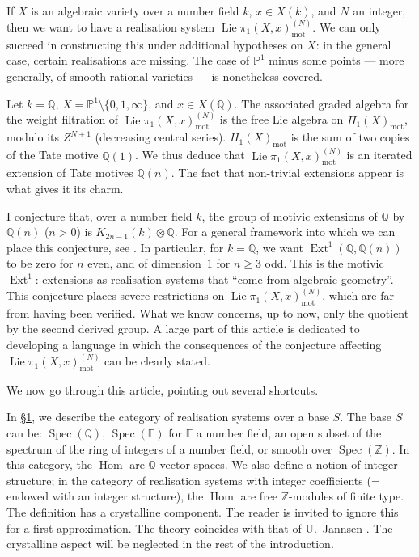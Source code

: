 \documentclass{article}
\theoremstyle{definition}
\newcommand{\mot}{\mathrm{mot}}
\newcommand{\bb}{\mathbb}
\newcommand{\PP}{\bb{P}}
\newcommand{\ZZ}{\bb{Z}}
\newcommand{\FF}{\bb{F}}
\newcommand{\QQ}{\bb{Q}}
\renewcommand{\geq}{\geqslant}
\DeclareMathOperator{\Lie}{Lie}
\DeclareMathOperator{\Ext}{Ext}
\DeclareMathOperator{\Spec}{Spec}
\DeclareMathOperator{\Hom}{Hom}
\newcommand{\oldpage}[1]{\marginpar{\footnotesize$\Big\vert$ \textit{p.~#1}}}
\begin{document}
If $X$ is an algebraic variety over a number field $k$, $x\in X(k)$, and $N$ an integer, then we want to have a realisation system $\Lie\pi_1(X,x)_\mot^{(N)}$.
We can only succeed in constructing this under additional hypotheses on $X$: in the general case, certain realisations are missing.
The case of $\PP^1$ minus some points --- more generally, of smooth rational varieties --- is nonetheless covered.

Let $k=\QQ$, $X=\PP^1\setminus\{0,1,\infty\}$, and $x\in X(\QQ)$.
The associated graded algebra for the weight filtration of $\Lie\pi_1(X,x)_\mot^{(N)}$ is the free Lie algebra on $H_1(X)_\mot$, modulo its $Z^{N+1}$ (decreasing central series).
$H_1(X)_\mot$ is the sum of two copies of the Tate motive $\QQ(1)$.
We thus deduce that $\Lie\pi_1(X,x)_\mot^{(N)}$ is an iterated extension of Tate motives $\QQ(n)$.
The fact that non-trivial extensions appear is what gives it its charm.

I conjecture that, over a number field $k$, the group of motivic extensions of $\QQ$ by $\QQ(n)$ ($n>0$) is $K_{2n-1}(k)\otimes\QQ$.
For a general framework into which we can place this conjecture, see \cite[§5]{B}.
In particular, for $k=\QQ$, we want $\Ext^1(\QQ,\QQ(n))$ to be zero for $n$ even, and of dimension~$1$ for $n\geq3$ odd.
This is the motivic $\Ext^1$: extensions as realisation systems that ``come from algebraic geometry''.
This conjecture places severe restrictions on $\Lie\pi_1(X,x)_\mot^{(N)}$, which are far from having been verified.
What we know concerns, up to now, only the quotient by the second derived group.
A large part of this article is dedicated to developing a language in which the consequences of the conjecture affecting $\Lie\pi_1(X,x)_\mot^{(N)}$ can be clearly stated.

We now go through this article, pointing out several shortcuts.

In \hyperref[1]{\S1}, we describe the category of realisation systems over a base $S$.
The base $S$ can be: $\Spec(\QQ)$, $\Spec(\FF)$ for $\FF$ a number field, an open subset of the spectrum of the ring of integers of a number field, or smooth over $\Spec(\ZZ)$.
In this category, the $\Hom$ are $\QQ$-vector spaces.
We also define a notion of integer structure;
in the category of realisation systems with integer coefficients (= endowed with an integer structure), the $\Hom$ are free $\ZZ$-modules of finite type.
The definition has a crystalline component.
The reader is invited to ignore this for a first approximation.
The theory coincides with that of U.~Jannsen
\oldpage{6~(84)}
\cite{J}.
The crystalline aspect will be neglected in the rest of the introduction.
\end{document}
